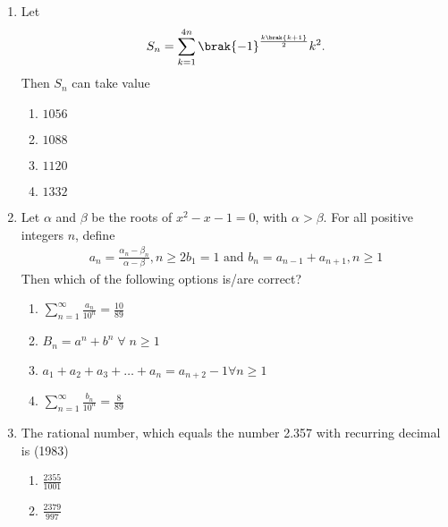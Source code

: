 \begin{enumerate}[label=\thesubsection.\arabic*,ref=\thesubsection.\theenumi]
	  \hfill (2018)
	  \begin{multicols}{4}
\begin{enumerate}    
  \item {248} \item{464}
  \item{496}
  \item{232}
  \end{enumerate}
\end{multicols}
%
\item Let \begin{align*} S_n=\sum_{k=1}^{4n}\brak{-1}^\frac{k\brak{k+1}}{2}k^2.\end{align*}  Then $S_n$ can take value  \hfill{}
\begin{multicols}{4}
\begin{enumerate}    
\item $1056$
\item $1088$
\item $1120$
\item $1332$
\end{enumerate}
\end{multicols}
%
\item Let $\alpha$ and $\beta$ be the roots of $x^2-x-1=0$,  with $\alpha>\beta$. For all positive integers $n$,  define
\begin{align*}
a_n=\frac{\alpha_n-\beta_n}{\alpha-\beta}, n\geq2
b_1=1  \text{ and }  b_n=a_{n-1}+a_{n+1}, n\geq1
\end{align*}
Then which of the following options is/are correct?
\hfill{}
\begin{multicols}{2}
\begin{enumerate}    
\item $\sum_{n=1}^{\infty}\frac{a_n}{10^n}=\frac{10}{89}$
\item $B_n=a^n+b^n \;  \forall \;  n\geq1$
\item $a_1+a_2+a_3+\dots+a_n=a_{n+2}-1 \forall n\geq1$
\item $\sum_{n=1}^{\infty}\frac{b_n}{10^n}=\frac{8}{89}$
\end{enumerate}
\end{multicols}
%
	\item The rational number,  which equals the number 2.357 with recurring decimal is 
		\hfill{(1983)}
    \begin{multicols}{4}
\begin{enumerate}     \itemsep 1ex
        \item $\frac{2355}{1001}$ 
        \item $\frac{2379}{997}$ 

\end{enumerate}
\end{multicols}
\end{enumerate}
